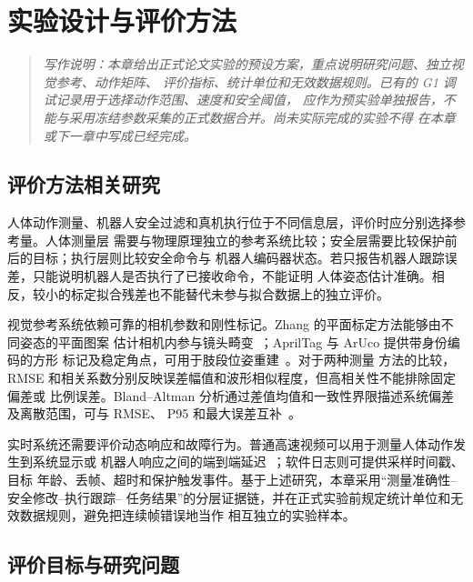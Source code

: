 
\chapter{实验设计与评价方法}
\label{chap:experimental_design}

\begin{quote}
\itshape
写作说明：本章给出正式论文实验的预设方案，重点说明研究问题、独立视觉参考、动作矩阵、
评价指标、统计单位和无效数据规则。已有的 G1 调试记录用于选择动作范围、速度和安全阈值，
应作为预实验单独报告，不能与采用冻结参数采集的正式数据合并。尚未实际完成的实验不得
在本章或下一章中写成已经完成。
\end{quote}

\section{评价方法相关研究}
\label{sec:ch6_related_evaluation}

人体动作测量、机器人安全过滤和真机执行位于不同信息层，评价时应分别选择参考量。人体测量层
需要与物理原理独立的参考系统比较；安全层需要比较保护前后的目标；执行层则比较安全命令与
机器人编码器状态。若只报告机器人跟踪误差，只能说明机器人是否执行了已接收命令，不能证明
人体姿态估计准确。相反，较小的标定拟合残差也不能替代未参与拟合数据上的独立评价。

视觉参考系统依赖可靠的相机参数和刚性标记。Zhang 的平面标定方法能够由不同姿态的平面图案
估计相机内参与镜头畸变~\cite{zhang2000flexible}；AprilTag 与 ArUco 提供带身份编码的方形
标记及稳定角点，可用于肢段位姿重建~\cite{olson2011apriltag,garrido2014aruco}。对于两种测量
方法的比较，RMSE 和相关系数分别反映误差幅值和波形相似程度，但高相关性不能排除固定偏差或
比例误差。Bland--Altman 分析通过差值均值和一致性界限描述系统偏差及离散范围，可与 RMSE、
P95 和最大误差互补~\cite{bland1986statistical}。

实时系统还需要评价动态响应和故障行为。普通高速视频可以用于测量人体动作发生到系统显示或
机器人响应之间的端到端延迟~\cite{feldstein2021latency}；软件日志则可提供采样时间戳、目标
年龄、丢帧、超时和保护触发事件。基于上述研究，本章采用“测量准确性--安全修改--执行跟踪--
任务结果”的分层证据链，并在正式实验前规定统计单位和无效数据规则，避免把连续帧错误地当作
相互独立的实验样本。

\section{评价目标与研究问题}
\label{sec:ch6_research_questions}

